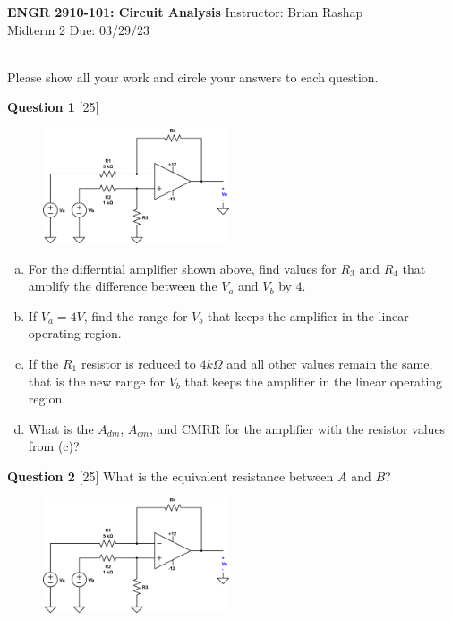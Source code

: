 \documentclass[12pt]{article}
\begin{document}
\begin{center}
\hfil
{\large\bf {ENGR 2910-101: Circuit Analysis}}
\hfill Instructor: Brian Rashap\\
Midterm 2  \hfill Due: 03/29/23\\
\hrulefill\\
\end{center}

Please show all your work and circle your answers to each question.
\newline\newline

{\bf Question 1} [25]
\newline

\begin{figure}[h!]
\centering 
\includegraphics[clip,width=0.49\textwidth]{mid2_1.png}
\end{figure}

\begin{enumerate}[(a)]
\item For the differntial amplifier shown above, find values for $R_3$ and $R_4$ that amplify the difference between the $V_a$ and $V_b$ by 4.
\item If $V_a = 4V$, find the range for $V_b$ that keeps the amplifier in the linear operating region.
\item If the $R_1$ resistor is reduced to $4k\Omega$ and all other values remain the same, that is the new range for $V_b$ that keeps the amplifier in the linear operating region.
\item What is the $A_{dm}$, $A_{cm}$, and CMRR for the amplifier with the resistor values from (c)?
\end{enumerate}

{\bf Question 2} [25] 
\newline
What is the equivalent resistance between $A$ and $B$?

\begin{figure}[h!]
  \centering 
 \vspace{-0.1in}
 \includegraphics[clip,width=0.49\textwidth]{mid2_1.png}
\vspace{-0.1in}
\end{figure}
\end{document}
